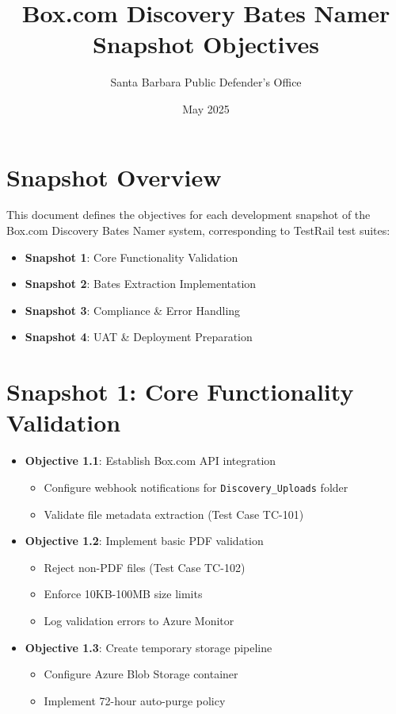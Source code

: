 \documentclass{article}
\title{Box.com Discovery Bates Namer \\ Snapshot Objectives}
\author{Santa Barbara Public Defender's Office}
\date{May 2025}
\begin{document}
\maketitle

\section*{Snapshot Overview}
This document defines the objectives for each development snapshot of the Box.com Discovery Bates Namer system, corresponding to TestRail test suites:

\begin{itemize}
    \item \textbf{Snapshot 1}: Core Functionality Validation
    \item \textbf{Snapshot 2}: Bates Extraction Implementation
    \item \textbf{Snapshot 3}: Compliance \& Error Handling
    \item \textbf{Snapshot 4}: UAT \& Deployment Preparation
\end{itemize}

\section*{Snapshot 1: Core Functionality Validation}
\label{sec:snapshot1}
\begin{itemize}[leftmargin=*]
    \item \textbf{Objective 1.1}: Establish Box.com API integration
    \begin{itemize}
        \item Configure webhook notifications for \texttt{Discovery\_Uploads} folder
        \item Validate file metadata extraction (Test Case TC-101)
    \end{itemize}
    
    \item \textbf{Objective 1.2}: Implement basic PDF validation
    \begin{itemize}
        \item Reject non-PDF files (Test Case TC-102)
        \item Enforce 10KB-100MB size limits
        \item Log validation errors to Azure Monitor
    \end{itemize}
    
    \item \textbf{Objective 1.3}: Create temporary storage pipeline
    \begin{itemize}
        \item Configure Azure Blob Storage container
        \item Implement 72-hour auto-purge policy
    \end{itemize}
\end{itemize}
\end{document}
